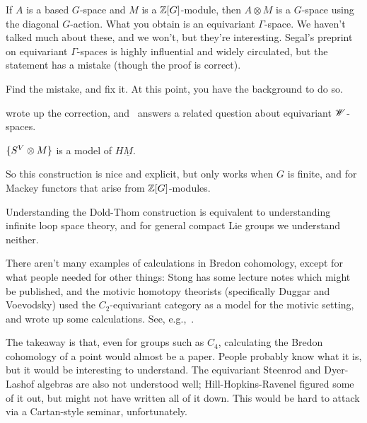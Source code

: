\begin{cons}
If $A$ is a based $G$-space and $M$ is a $\mathbb Z[G]$-module, then $A\otimes M$ is a $G$-space using the diagonal
$G$-action. What you obtain is an equivariant $\Gamma$-space. We haven't talked much about these, and we won't, but
they're interesting. Segal's preprint on equivariant $\Gamma$-spaces  is highly influential and
widely circulated, but the statement has a mistake (though the proof is correct).
\begin{ex}
Find the mistake, and fix it. At this point, you have the background to do so.
\end{ex}
\cite{Shi89} wrote up the correction, and~\cite{BlumbergWSpace} answers a related question about equivariant
$\mathscr W$-spaces.
\begin{thm}
$\{S^V\otimes M\}$ is a model of $H\underline M$.
\end{thm}
So this construction is nice and explicit, but only works when $G$ is finite, and for Mackey functors that arise
from $\mathbb Z[G]$-modules.
\end{cons}
Understanding the Dold-Thom construction is equivalent to understanding infinite loop space theory, and for general
compact Lie groups we understand neither.

There aren't many examples of calculations in Bredon cohomology, except for what people needed for other things:
Stong has some lecture notes which might be published, and the motivic homotopy theorists (specifically Duggar and
Voevodsky) used the $C_2$-equivariant category as a model for the motivic setting, and wrote up some calculations.
See, e.g.,~\cite{Lew88, Dug15}.

The takeaway is that, even for groups such as $C_4$, calculating the Bredon cohomology of a point would almost be a
paper. People probably know what it is, but it would be interesting to understand. The equivariant Steenrod and
Dyer-Lashof algebras are also not understood well; Hill-Hopkins-Ravenel figured some of it out, but might not have
written all of it down. This would be hard to attack via a Cartan-style seminar, unfortunately.

